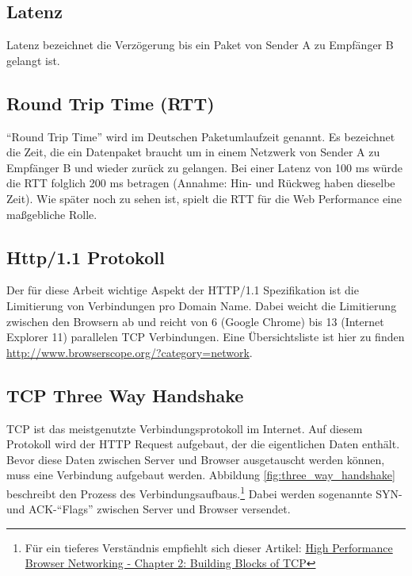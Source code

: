 

	\subsection{Latenz} %
	\label{sub:latenz}
		Latenz bezeichnet die Verzögerung bis ein Paket von Sender A zu Empfänger B gelangt ist.


	\subsection{Round Trip Time (RTT)} %
	\label{sub:round_trip_time_}
		"`Round Trip Time"' wird im Deutschen Paketumlaufzeit genannt. Es bezeichnet die Zeit, die ein Datenpaket braucht um in einem Netzwerk von Sender A zu Empfänger B und wieder zurück zu gelangen. Bei einer Latenz von 100 ms würde die RTT folglich 200 ms betragen (Annahme: Hin- und Rückweg haben dieselbe Zeit). Wie später noch zu sehen ist, spielt die RTT für die Web Performance eine maßgebliche Rolle.
	


	\subsection{Http/1.1 Protokoll}
	\label{sub:http_1_1_Protokoll}
		Der für diese Arbeit wichtige Aspekt der HTTP/1.1 Spezifikation ist die Limitierung von Verbindungen pro Domain Name. Dabei weicht die Limitierung zwischen den Browsern ab und reicht von 6 (Google Chrome) bis 13 (Internet Explorer 11) parallelen TCP Verbindungen. Eine Übersichtsliste ist hier zu finden \url{http://www.browserscope.org/?category=network}.


	\subsection{TCP Three Way Handshake}
	\label{sub:tcp_three_way_handshake}
		TCP ist das meistgenutzte Verbindungsprotokoll im Internet. Auf diesem Protokoll wird der HTTP Request aufgebaut, der die eigentlichen Daten enthält.
		Bevor diese Daten zwischen Server und Browser ausgetauscht werden können, muss eine Verbindung aufgebaut werden. Abbildung \ref{fig:three_way_handshake} beschreibt den Prozess des Verbindungsaufbaus.\footnote{Für ein tieferes Verständnis empfiehlt sich dieser Artikel: \href{http://chimera.labs.oreilly.com/books/1230000000545/ch02.html}{High Performance Browser Networking - Chapter 2: Building Blocks of TCP}} Dabei werden sogenannte SYN- und ACK-"`Flags"' zwischen Server und Browser versendet.

